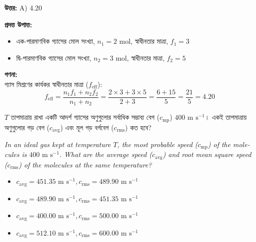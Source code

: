 \documentclass[12pt, a4paper]{article}
\begin{document}
\vspace{0.5em}
\begin{tcolorbox}[answerbox]
    \textbf{\color{success} উত্তর:} A)  4.20
\end{tcolorbox}
\vspace{1em}

\begin{tcolorbox}[solutionbox={সমাধান (Solution)}]
    \noindent
    \textbf{প্রদত্ত উপাত্ত:}
    \begin{itemize}[leftmargin=1.5em, itemsep=0.2em]
        \item এক-পারমাণবিক গ্যাসের মোল সংখ্যা, $n_1 = 2\text{ mol}$, স্বাধীনতার মাত্রা, $f_1 = 3$
        \item দ্বি-পারমাণবিক গ্যাসের মোল সংখ্যা, $n_2 = 3\text{ mol}$, স্বাধীনতার মাত্রা, $f_2 = 5$
    \end{itemize}

    \vspace{0.6em}
    \noindent\textbf{গণনা:} \\
    গ্যাস মিশ্রণের কার্যকর স্বাধীনতার মাত্রা ($f_{\text{eff}}$):
    \[ f_{\text{eff}} = \frac{n_1 f_1 + n_2 f_2}{n_1 + n_2} = \frac{2 \times 3 + 3 \times 5}{2 + 3} = \frac{6 + 15}{5} = \frac{21}{5} = \mathbf{4.20} \]
    
\end{tcolorbox}


\begin{tcolorbox}[questionbox={প্রশ্ন (Question) 4}]
    \noindent
    $T$ তাপমাত্রায় রাখা একটি আদর্শ গ্যাসের অণুগুলোর সর্বাধিক সম্ভাব্য বেগ ($c_{\text{mp}}$) $400\text{ m s}^{-1}$। একই তাপমাত্রায় অণুগুলোর গড় বেগ ($c_{\text{avg}}$) এবং মূল গড় বর্গবেগ ($c_{\text{rms}}$) কত হবে?
    
    \vspace{0.8em}
    \begin{english}
    \noindent\textit{\color{darkgray}
    In an ideal gas kept at temperature $T$, the most probable speed ($c_{\text{mp}}$) of the molecules is $400\text{ m s}^{-1}$. What are the average speed ($c_{\text{avg}}$) and root mean square speed ($c_{\text{rms}}$) of the molecules at the same temperature?
    }
    \end{english}
\end{tcolorbox}

\begin{itemize}[label={}, leftmargin=1cm, itemsep=0.5em]
    \item[\textbf{A)}] $c_{\text{avg}} = 451.35\text{ m s}^{-1}, c_{\text{rms}} = 489.90\text{ m s}^{-1}$
    \item[\textbf{B)}] $c_{\text{avg}} = 489.90\text{ m s}^{-1}, c_{\text{rms}} = 451.35\text{ m s}^{-1}$
    \item[\textbf{C)}] $c_{\text{avg}} = 400.00\text{ m s}^{-1}, c_{\text{rms}} = 500.00\text{ m s}^{-1}$
    \item[\textbf{D)}] $c_{\text{avg}} = 512.10\text{ m s}^{-1}, c_{\text{rms}} = 600.00\text{ m s}^{-1}$
\end{itemize}
\end{document}
